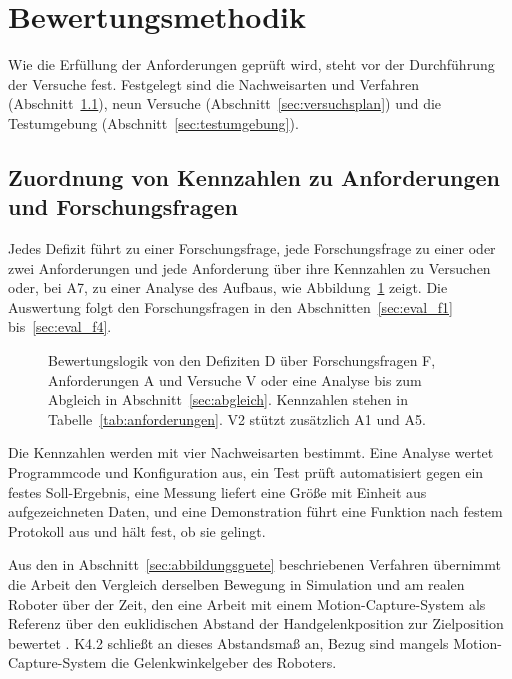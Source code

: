 \section{Bewertungsmethodik}
\label{sec:bewertungsmethodik}
Wie die Erfüllung der Anforderungen geprüft wird, steht vor der Durchführung der Versuche fest.
Festgelegt sind die Nachweisarten und Verfahren (Abschnitt~\ref{sec:kennzahlen}), neun Versuche (Abschnitt~\ref{sec:versuchsplan}) und die Testumgebung (Abschnitt~\ref{sec:testumgebung}).

\subsection{Zuordnung von Kennzahlen zu Anforderungen und Forschungsfragen}
\label{sec:kennzahlen}
Jedes Defizit führt zu einer Forschungsfrage, jede Forschungsfrage zu einer oder zwei Anforderungen und jede Anforderung über ihre Kennzahlen zu Versuchen oder, bei A7, zu einer Analyse des Aufbaus, wie Abbildung~\ref{fig:bewertungslogik} zeigt.
Die Auswertung folgt den Forschungsfragen in den Abschnitten~\ref{sec:eval_f1} bis~\ref{sec:eval_f4}.

\begin{figure}[!htbp]
  \centering
  
  \caption[Bewertungslogik von den Defiziten zum Abgleich]{Bewertungslogik von den Defiziten D über Forschungsfragen F, Anforderungen A und Versuche V oder eine Analyse bis zum Abgleich in Abschnitt~\ref{sec:abgleich}. Kennzahlen stehen in Tabelle~\ref{tab:anforderungen}. V2 stützt zusätzlich A1 und A5.}
  \label{fig:bewertungslogik}
\end{figure}

Die Kennzahlen werden mit vier Nachweisarten bestimmt.
Eine Analyse wertet Programmcode und Konfiguration aus, ein Test prüft automatisiert gegen ein festes Soll-Ergebnis, eine Messung liefert eine Größe mit Einheit aus aufgezeichneten Daten, und eine Demonstration führt eine Funktion nach festem Protokoll aus und hält fest, ob sie gelingt.

Aus den in Abschnitt~\ref{sec:abbildungsguete} beschriebenen Verfahren übernimmt die Arbeit den Vergleich derselben Bewegung in Simulation und am realen Roboter über der Zeit, den eine Arbeit mit einem Motion-Capture-System als Referenz über den euklidischen Abstand der Handgelenkposition zur Zielposition bewertet \cite{Collins2019}.
K4.2 schließt an dieses Abstandsmaß an, Bezug sind mangels Motion-Capture-System die Gelenkwinkelgeber des Roboters.

